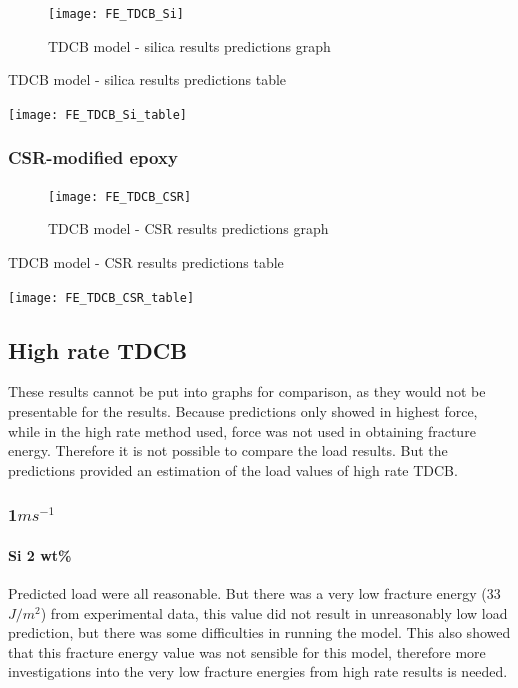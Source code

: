\documentclass[numbers=noendperiod,chapterprefix=on]{icldt} %
\begin{document}
\begin{figure}[!htpb]
  \centering
  \texttt{[image: FE\_TDCB\_Si]}
  \caption{TDCB model - silica results predictions graph}\label{FE_TDCB_Si}
  \end{figure}
  \FloatBarrier


\begin{table}[!htpb]
  \centering
   \caption{TDCB model - silica results predictions table}\label{FE_TDCB_Si_table}
  \texttt{[image: FE\_TDCB\_Si\_table]}
  \end{table}
  \FloatBarrier



\subsubsection{CSR-modified epoxy}


\begin{figure}[!htpb]
  \centering
  \texttt{[image: FE\_TDCB\_CSR]}
  \caption{TDCB model - CSR results predictions graph}\label{FE_TDCB_CSR}
  \end{figure}
  \FloatBarrier
  
  \begin{table}[!htpb]
    \centering
    \caption{TDCB model - CSR results predictions table}\label{FE_TDCB_CSR_table}
    \texttt{[image: FE\_TDCB\_CSR\_table]}
    \end{table}
    \FloatBarrier

\subsection{High rate TDCB}
These results cannot be put into graphs for comparison, as they would not be presentable for the results.
Because predictions only showed in highest force, while in the high rate method used, force was not used in obtaining fracture energy. Therefore it is not possible to compare the load results. But the predictions provided an estimation of the load values of high rate TDCB.


\subsubsection{1$ms^{-1}$}
\paragraph{Si 2 wt\%}
Predicted load were all reasonable. But there was a very low fracture energy (33 $J/m^{2}$) from experimental data, this value did not result in unreasonably low load prediction, but there was some difficulties in running the model. This also showed that this fracture energy value was not sensible for this model, therefore more investigations into the very low fracture energies from high rate results is needed.
\end{document}
